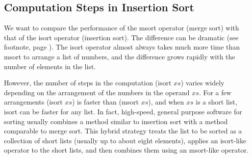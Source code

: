 \begin{exercises}




\end{exercises}

\subsection{Computation Steps in Insertion Sort}
\label{subsec:isort-steps}

We want to compare the performance of
the \textsf{msort} operator (merge sort)
with that of the \textsf{isort} operator (insertion sort).
The difference can be dramatic
(see footnote, page \pageref{bubble-vs-quicksort-example}).
The \textsf{isort} operator almost always
takes much more time than \textsf{msort}
to arrange a list of numbers,
and the difference grows rapidly with the number of elements in the list.

However, the number of steps in the computation \textsf{(isort $xs$)}
varies widely depending on the arrangement of the numbers in the operand $xs$.
For a few arrangements
\textsf{(isort $xs$)} is faster than \textsf{(msort $xs$)},
and when $xs$ is a short list, \textsf{isort} can be faster for any list.
In fact, high-speed, general purpose software for sorting
usually combines a method similar to insertion sort
with a method comparable to merge sort.
This hybrid strategy treats
the list to be sorted as a collection of short lists
(usually up to about eight elements),
applies an \textsf{isort}-like operator to the short lists,
and then combines them
using an \textsf{msort}-like operator.

